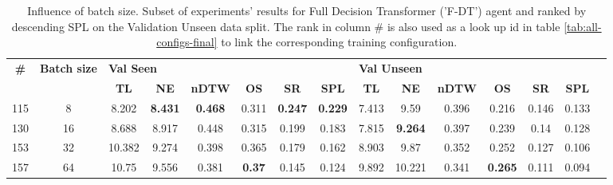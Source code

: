 \begin{table}
\centering
\caption{\label{tab:f_dt_batch_test}Influence of batch size. Subset of experiments' results for Full Decision Transformer ('F-DT') agent and ranked by descending SPL on the Validation Unseen data split. The rank in column \# is also used as a look up id in table \ref{tab:all-configs-final} to link the corresponding training configuration.}
\begin{tabular}{@{\hskip3pt}c@{\hskip3pt}c@{\hskip3pt}c@{\hskip3pt}c@{\hskip3pt}c@{\hskip3pt}c@{\hskip3pt}c@{\hskip3pt}c@{\hskip3pt}c@{\hskip3pt}c@{\hskip3pt}c@{\hskip3pt}c@{\hskip3pt}c@{\hskip3pt}c@{\hskip3pt}c}
\toprule
\textbf{\#} & \textbf{Batch size} & \multicolumn{6}{l}{\textbf{Val Seen}} & \multicolumn{6}{l}{\textbf{Val Unseen}} \\
 \textbf{~} &          \textbf{~} &       \textbf{TL} &     \textbf{NE} &   \textbf{nDTW} &    \textbf{OS} &     \textbf{SR} &    \textbf{SPL} &         \textbf{TL} &     \textbf{NE} & \textbf{nDTW} &     \textbf{OS} & \textbf{SR} & \textbf{SPL} \\
\midrule
        115 &                   8 &             8.202 &  \textbf{8.431} &  \textbf{0.468} &          0.311 &  \textbf{0.247} &  \textbf{0.229} &               7.413 &            9.59 &         0.396 &           0.216 &       0.146 &        0.133 \\
        130 &                  16 &             8.688 &           8.917 &           0.448 &          0.315 &           0.199 &           0.183 &               7.815 &  \textbf{9.264} &         0.397 &           0.239 &        0.14 &        0.128 \\
        153 &                  32 &            10.382 &           9.274 &           0.398 &          0.365 &           0.179 &           0.162 &               8.903 &            9.87 &         0.352 &           0.252 &       0.127 &        0.106 \\
        157 &                  64 &             10.75 &           9.556 &           0.381 &  \textbf{0.37} &           0.145 &           0.124 &               9.892 &          10.221 &         0.341 &  \textbf{0.265} &       0.111 &        0.094 \\
\bottomrule
\end{tabular}
\end{table}
